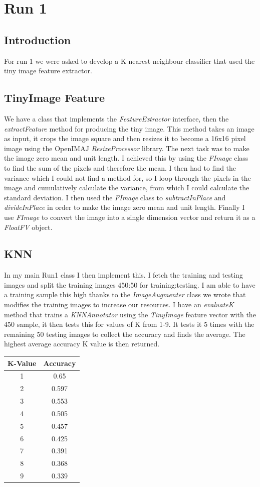 \documentclass{article}
\begin{document}
	
	\section{Run 1}
	
	\subsection{Introduction}
	For run 1 we were asked to develop a K nearest neighbour classifier that used the tiny image feature extractor.
	\subsection{TinyImage Feature}
	We have a class that implements the \textit{FeatureExtractor} interface, then the \textit{extractFeature} method for producing the tiny image.
	This method takes an image as input, it crops the image square and then resizes it to become a 16x16 pixel image using the OpenIMAJ \textit{ResizeProcessor} library.
	The next task was to make the image zero mean and unit length. I achieved this by using the \textit{FImage} class to find the sum of the pixels and therefore the mean. I then had to find the variance which I could not find a method for, so I loop through the pixels in the image and cumulatively calculate the variance, from which I could calculate the standard deviation.
	I then used the \textit{FImage} class to \textit{subtractInPlace} and \textit{divideInPlace} in order to make the image zero mean and unit length. Finally I use \textit{FImage} to convert the image into a single dimension vector and return it as a \textit{FloatFV} object.
	\subsection{KNN}
	In my main Run1 class I then implement this. I fetch the training and testing images and split the training images 450:50 for training:testing. I am able to have a training sample this high thanks to the \textit{ImageAugmenter} class we wrote that modifies the training images to increase our resources.
	I have an \textit{evaluateK} method that trains a \textit{KNNAnnotator} using the \textit{TinyImage} feature vector with the 450 sample, it then tests this for values of K from 1-9. It tests it 5 times with the remaining 50 testing images to collect the accuracy and finds the average. The highest average accuracy K value is then returned.\\
	\begin{tabular}{|c|c|}
		\hline
		K-Value & Accuracy\\ \hline \hline
		1 & 0.65\\
		2 & 0.597\\
		3 & 0.553\\
		4 & 0.505\\
		5 & 0.457\\
		6 & 0.425\\
		7 & 0.391\\
		8 & 0.368\\
		9 & 0.339\\ \hline
	\end{tabular}
	
\end{document}
